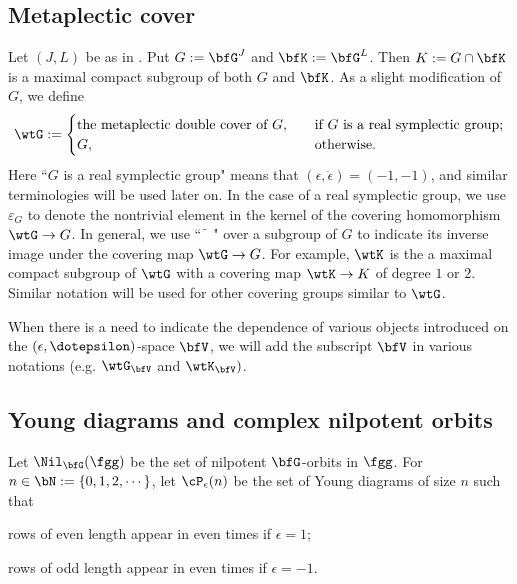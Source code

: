 \documentclass[12pt,a4paper]{amsart}
\makeatletter
\def\inn#1#2{\left\langle
      \def\ta{#1}\def\tb{#2}
      \ifx\ta\@empty{\;} \else {\ta}\fi ,
      \ifx\tb\@empty{\;} \else {\tb}\fi
      \right\rangle}
\numberwithin{equation}{section}
\theoremstyle{remark}
\def\wtbfK{\widetilde{\bfK}}
\makeatother
\begin{document}
\subsection{Metaplectic cover}\label{sec:MC}
Let $(J,L)$ be as in .  Put $G := \bfG^J$ and $\bfK :=
\bfG^L$. Then $K:=G\cap \bfK$ is a maximal compact subgroup of both $G$ and
$\bfK$.  As a slight modification of $G$, we define
 \[
   \wtG:=
   \begin{cases}
     \textrm{the metaplectic double cover of $G$},\quad
     &\textrm{if $G$ is a real symplectic group};\\
     G,\quad &\textrm{otherwise}.
   \end{cases}
 \]
 Here ``$G$ is a real symplectic group" means that $(\epsilon, \dot \epsilon)=(-1,-1)$, and similar terminologies will be used later on.
 In the case of a real symplectic group, we use $\varepsilon_G$
 to denote the nontrivial element in the kernel of the covering homomorphism
 $\wtG \rightarrow G$.  In general, we use ``$\,\widetilde{\phantom{a}}\,$"
 over a subgroup of $G$ to indicate its inverse image under the covering map
 $\wtG\rightarrow G$.
 For example, $\wtK$ is the a maximal compact subgroup of
 $\wtG$ with a covering map $\wtK\rightarrow K$ of degree $1$ or
 $2$. Similar notation will be used for other covering groups similar to $\wtG$.

 When there is a need to indicate the dependence of various objects introduced on the
 $(\epsilon,\dotepsilon)$-space $\bfV$, we will add the subscript $\bfV$ in various
 notations (e.g. $\wtG_{\bfV}$ and $\wtK_{\bfV})$.



\subsection{Young diagrams and complex nilpotent orbits}

Let $\Nil_{\bfG}(\fgg)$ be the set of nilpotent $\bfG$-orbits in $\fgg$.
For $n\in \bN:=\{ 0, 1,2, \cdots\}$, let $\cP_\epsilon(n)$ be the set of Young diagrams of size $n$ such that
\begin{enumI}
\item rows of even length appear in even times if $\epsilon=1$;
\item rows of odd length appear in even times if $\epsilon=-1$.
\end{enumI}
\end{document}
